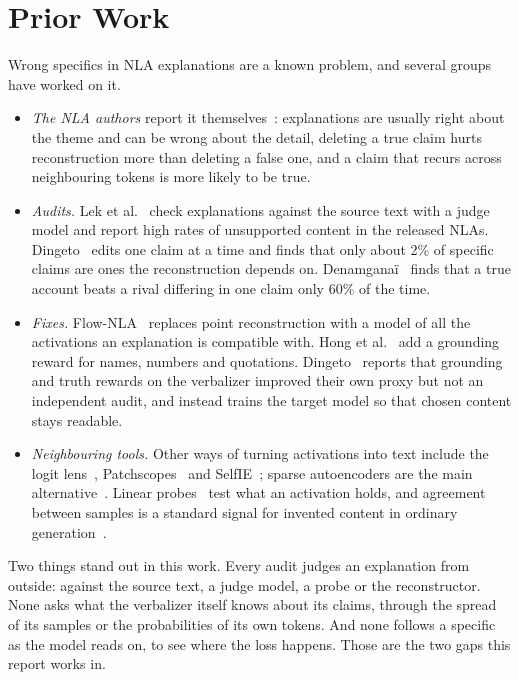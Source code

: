 \section{Prior Work}

Wrong specifics in NLA explanations are a known problem, and several groups have worked on it.

\begin{itemize}
\item \emph{The NLA authors} report it themselves~\cite{frasertaliente2026nla}: explanations are usually right
about the theme and can be wrong about the detail, deleting a true claim hurts reconstruction more than
deleting a false one, and a claim that recurs across neighbouring tokens is more likely to be true.
\item \emph{Audits.} Lek et al.~\cite{lek2026flownla} check explanations against the source text with a judge
model and report high rates of unsupported content in the released NLAs. Dingeto~\cite{dingeto2026recap}
edits one claim at a time and finds that only about 2\% of specific claims are ones the reconstruction
depends on. Denamgana\"i~\cite{denamganai2026monitorability} finds that a true account beats a rival
differing in one claim only 60\% of the time.
\item \emph{Fixes.} Flow-NLA~\cite{lek2026flownla} replaces point reconstruction with a model of all the
activations an explanation is compatible with. Hong et al.~\cite{hong2026grounding} add a grounding reward
for names, numbers and quotations. Dingeto~\cite{dingeto2026recap} reports that grounding and truth rewards
on the verbalizer improved their own proxy but not an independent audit, and instead trains the target model
so that chosen content stays readable.
\item \emph{Neighbouring tools.} Other ways of turning activations into text include the logit
lens~\cite{nostalgebraist2020logitlens}, Patchscopes~\cite{ghandeharioun2024patchscopes} and
SelfIE~\cite{chen2024selfie}; sparse autoencoders are the main
alternative~\cite{bricken2023monosemanticity,cunningham2023sparse}. Linear probes~\cite{alain2016probes} test
what an activation holds, and agreement between samples is a standard signal for invented content in
ordinary generation~\cite{manakul2023selfcheckgpt,wang2023selfconsistency}.
\end{itemize}

Two things stand out in this work. Every audit judges an explanation from outside: against the source text,
a judge model, a probe or the reconstructor. None asks what the verbalizer
itself knows about its claims, through the spread of its samples or the probabilities of its own tokens. And
none follows a specific as the model reads on, to see where the loss happens. Those are the two gaps this
report works in.


